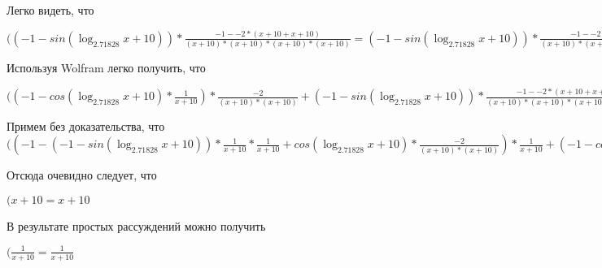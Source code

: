 \documentclass[12pt,a4paper,fleqn]{article}
\theoremstyle{definition}
\begin{document}
Легко видеть, что

$(( -1  - sin(\log_{ 2.71828 }{ x  +  10 })) * \frac{ -1  -  -2  * ( x  +  10  +  x  +  10 )}{( x  +  10 ) * ( x  +  10 ) * ( x  +  10 ) * ( x  +  10 )}
 = ( -1  - sin(\log_{ 2.71828 }{ x  +  10 })) * \frac{ -1  -  -2  * ( x  +  10  +  x  +  10 )}{( x  +  10 ) * ( x  +  10 ) * ( x  +  10 ) * ( x  +  10 )}
$

Используя Wolfram легко получить, что

$(( -1  - cos(\log_{ 2.71828 }{ x  +  10 }) * \frac{ 1 }{ x  +  10 }
) * \frac{ -2 }{( x  +  10 ) * ( x  +  10 )}
 + ( -1  - sin(\log_{ 2.71828 }{ x  +  10 })) * \frac{ -1  -  -2  * ( x  +  10  +  x  +  10 )}{( x  +  10 ) * ( x  +  10 ) * ( x  +  10 ) * ( x  +  10 )}
 = ( -1  - cos(\log_{ 2.71828 }{ x  +  10 }) * \frac{ 1 }{ x  +  10 }
) * \frac{ -2 }{( x  +  10 ) * ( x  +  10 )}
 + ( -1  - sin(\log_{ 2.71828 }{ x  +  10 })) * \frac{ -1  -  -2  * ( x  +  10  +  x  +  10 )}{( x  +  10 ) * ( x  +  10 ) * ( x  +  10 ) * ( x  +  10 )}
$

Примем без доказательства, что
$(( -1  - ( -1  - sin(\log_{ 2.71828 }{ x  +  10 })) * \frac{ 1 }{ x  +  10 }
 * \frac{ 1 }{ x  +  10 }
 + cos(\log_{ 2.71828 }{ x  +  10 }) * \frac{ -2 }{( x  +  10 ) * ( x  +  10 )}
) * \frac{ 1 }{ x  +  10 }
 + ( -1  - cos(\log_{ 2.71828 }{ x  +  10 }) * \frac{ 1 }{ x  +  10 }
) * \frac{ -2 }{( x  +  10 ) * ( x  +  10 )}
 + ( -1  - cos(\log_{ 2.71828 }{ x  +  10 }) * \frac{ 1 }{ x  +  10 }
) * \frac{ -2 }{( x  +  10 ) * ( x  +  10 )}
 + ( -1  - sin(\log_{ 2.71828 }{ x  +  10 })) * \frac{ -1  -  -2  * ( x  +  10  +  x  +  10 )}{( x  +  10 ) * ( x  +  10 ) * ( x  +  10 ) * ( x  +  10 )}
 = ( -1  - ( -1  - sin(\log_{ 2.71828 }{ x  +  10 })) * \frac{ 1 }{ x  +  10 }
 * \frac{ 1 }{ x  +  10 }
 + cos(\log_{ 2.71828 }{ x  +  10 }) * \frac{ -2 }{( x  +  10 ) * ( x  +  10 )}
) * \frac{ 1 }{ x  +  10 }
 + ( -1  - cos(\log_{ 2.71828 }{ x  +  10 }) * \frac{ 1 }{ x  +  10 }
) * \frac{ -2 }{( x  +  10 ) * ( x  +  10 )}
 + ( -1  - cos(\log_{ 2.71828 }{ x  +  10 }) * \frac{ 1 }{ x  +  10 }
) * \frac{ -2 }{( x  +  10 ) * ( x  +  10 )}
 + ( -1  - sin(\log_{ 2.71828 }{ x  +  10 })) * \frac{ -1  -  -2  * ( x  +  10  +  x  +  10 )}{( x  +  10 ) * ( x  +  10 ) * ( x  +  10 ) * ( x  +  10 )}
$

Отсюда очевидно следует, что

$( x  +  10  =  x  +  10 $

В результате простых рассуждений можно получить

$(\frac{ 1 }{ x  +  10 }
 = \frac{ 1 }{ x  +  10 }
$
\end{document}
